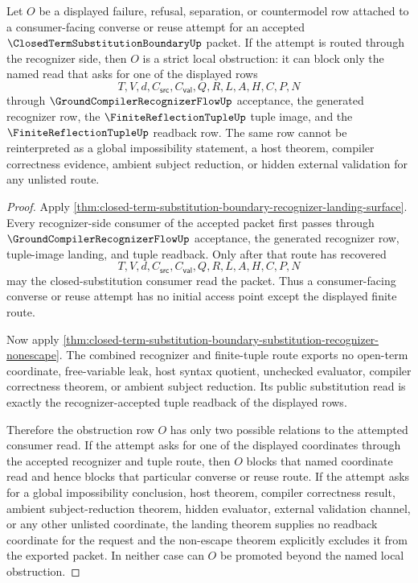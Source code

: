 \begin{corollary}
\label{cor:closed-term-substitution-boundary-recognizer-strict-local-obstruction}
Let $O$ be a displayed failure, refusal, separation, or countermodel row attached to a consumer-facing converse or reuse attempt for an accepted $\ClosedTermSubstitutionBoundaryUp$ packet. If the attempt is routed through the recognizer side, then $O$ is a strict local obstruction: it can block only the named read that asks for one of the displayed rows
$$
T,V,d,C_{\mathsf{src}},C_{\mathsf{val}},Q,R,L,A,H,C,P,N
$$
through $\GroundCompilerRecognizerFlowUp$ acceptance, the generated recognizer row, the $\FiniteReflectionTupleUp$ tuple image, and the $\FiniteReflectionTupleUp$ readback row. The same row cannot be reinterpreted as a global impossibility statement, a host theorem, compiler correctness evidence, ambient subject reduction, or hidden external validation for any unlisted route.
\end{corollary}
\begin{proof}
Apply \autoref{thm:closed-term-substitution-boundary-recognizer-landing-surface}. Every recognizer-side consumer of the accepted packet first passes through $\GroundCompilerRecognizerFlowUp$ acceptance, the generated recognizer row, tuple-image landing, and tuple readback. Only after that route has recovered
$$
T,V,d,C_{\mathsf{src}},C_{\mathsf{val}},Q,R,L,A,H,C,P,N
$$
may the closed-substitution consumer read the packet. Thus a consumer-facing converse or reuse attempt has no initial access point except the displayed finite route.

Now apply \autoref{thm:closed-term-substitution-boundary-substitution-recognizer-nonescape}. The combined recognizer and finite-tuple route exports no open-term coordinate, free-variable leak, host syntax quotient, unchecked evaluator, compiler correctness theorem, or ambient subject reduction. Its public substitution read is exactly the recognizer-accepted tuple readback of the displayed rows.

Therefore the obstruction row $O$ has only two possible relations to the attempted consumer read. If the attempt asks for one of the displayed coordinates through the accepted recognizer and tuple route, then $O$ blocks that named coordinate read and hence blocks that particular converse or reuse route. If the attempt asks for a global impossibility conclusion, host theorem, compiler correctness result, ambient subject-reduction theorem, hidden evaluator, external validation channel, or any other unlisted coordinate, the landing theorem supplies no readback coordinate for the request and the non-escape theorem explicitly excludes it from the exported packet. In neither case can $O$ be promoted beyond the named local obstruction.
\end{proof}
